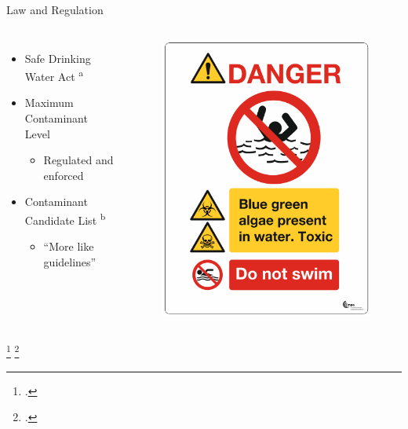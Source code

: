 \begin{frame}{Law and Regulation}
	\begin{columns}
	\begin{itemize}
		\item Safe Drinking Water Act \textsuperscript{a}  	
		\item Maximum Contaminant Level 
			\begin{itemize}
				\item Regulated and enforced
			\end{itemize}
		\item Contaminant Candidate List \textsuperscript{b} 
			\begin{itemize}
				\item ``More like guidelines''
			\end{itemize}
	\end{itemize}

	\begin{figure}
		\centering
		\includegraphics[scale=0.3]{warning.PNG}
	\end{figure}
	
	\end{columns}
	\footcitetext{[a], noauthor_guidelines_1998}
	\footcitetext{[b], usepa_drinking_2016}
\end{frame}


